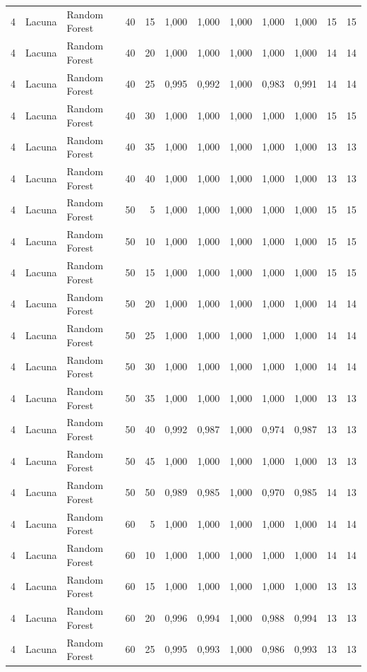 \begin{longtable}{@{}rllrrrrrrrrr@{}}
4 & Lacuna & Random Forest & 40 & 15 & 1,000 & 1,000 & 1,000 & 1,000 & 1,000 & 15 & 15 \\
4 & Lacuna & Random Forest & 40 & 20 & 1,000 & 1,000 & 1,000 & 1,000 & 1,000 & 14 & 14 \\
4 & Lacuna & Random Forest & 40 & 25 & 0,995 & 0,992 & 1,000 & 0,983 & 0,991 & 14 & 14 \\
4 & Lacuna & Random Forest & 40 & 30 & 1,000 & 1,000 & 1,000 & 1,000 & 1,000 & 15 & 15 \\
4 & Lacuna & Random Forest & 40 & 35 & 1,000 & 1,000 & 1,000 & 1,000 & 1,000 & 13 & 13 \\
4 & Lacuna & Random Forest & 40 & 40 & 1,000 & 1,000 & 1,000 & 1,000 & 1,000 & 13 & 13 \\
4 & Lacuna & Random Forest & 50 & 5 & 1,000 & 1,000 & 1,000 & 1,000 & 1,000 & 15 & 15 \\
4 & Lacuna & Random Forest & 50 & 10 & 1,000 & 1,000 & 1,000 & 1,000 & 1,000 & 15 & 15 \\
4 & Lacuna & Random Forest & 50 & 15 & 1,000 & 1,000 & 1,000 & 1,000 & 1,000 & 15 & 15 \\
4 & Lacuna & Random Forest & 50 & 20 & 1,000 & 1,000 & 1,000 & 1,000 & 1,000 & 14 & 14 \\
4 & Lacuna & Random Forest & 50 & 25 & 1,000 & 1,000 & 1,000 & 1,000 & 1,000 & 14 & 14 \\
4 & Lacuna & Random Forest & 50 & 30 & 1,000 & 1,000 & 1,000 & 1,000 & 1,000 & 14 & 14 \\
4 & Lacuna & Random Forest & 50 & 35 & 1,000 & 1,000 & 1,000 & 1,000 & 1,000 & 13 & 13 \\
4 & Lacuna & Random Forest & 50 & 40 & 0,992 & 0,987 & 1,000 & 0,974 & 0,987 & 13 & 13 \\
4 & Lacuna & Random Forest & 50 & 45 & 1,000 & 1,000 & 1,000 & 1,000 & 1,000 & 13 & 13 \\
4 & Lacuna & Random Forest & 50 & 50 & 0,989 & 0,985 & 1,000 & 0,970 & 0,985 & 14 & 13 \\
4 & Lacuna & Random Forest & 60 & 5 & 1,000 & 1,000 & 1,000 & 1,000 & 1,000 & 14 & 14 \\
4 & Lacuna & Random Forest & 60 & 10 & 1,000 & 1,000 & 1,000 & 1,000 & 1,000 & 14 & 14 \\
4 & Lacuna & Random Forest & 60 & 15 & 1,000 & 1,000 & 1,000 & 1,000 & 1,000 & 13 & 13 \\
4 & Lacuna & Random Forest & 60 & 20 & 0,996 & 0,994 & 1,000 & 0,988 & 0,994 & 13 & 13 \\
4 & Lacuna & Random Forest & 60 & 25 & 0,995 & 0,993 & 1,000 & 0,986 & 0,993 & 13 & 13 \\

\end{longtable}
